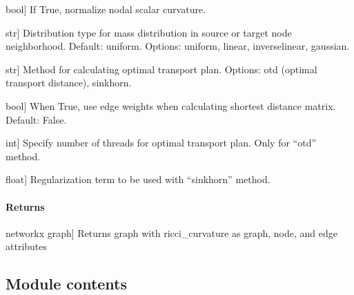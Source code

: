 \documentclass[letterpaper,10pt,english]{sphinxmanual}
\begin{document}
\begin{fulllineitems}
\begin{fulllineitems}
\begin{description}
\sphinxlineitem{norm}{[}bool{]}
\sphinxAtStartPar
If True, normalize nodal scalar curvature.

\sphinxlineitem{dist\_type}{[}str{]}
\sphinxAtStartPar
Distribution type for mass distribution in source or target node neighborhood. Default: uniform. Options: uniform, linear, inverse\sphinxhyphen{}linear, gaussian.

\sphinxlineitem{method}{[}str{]}
\sphinxAtStartPar
Method for calculating optimal transport plan. Options: otd (optimal transport distance), sinkhorn.

\sphinxlineitem{weight\_path\_matrix}{[}bool{]}
\sphinxAtStartPar
When True, use edge weights when calculating shortest distance matrix. Default: False.

\sphinxlineitem{numThreads}{[}int{]}
\sphinxAtStartPar
Specify number of threads for optimal transport plan. Only for “otd” method.

\sphinxlineitem{reg}{[}float{]}
\sphinxAtStartPar
Regularization term to be used with “sinkhorn” method.

\end{description}


\paragraph{Returns}
\label{\detokenize{graph_ricci_curvature:id7}}\begin{description}
\sphinxlineitem{self.G}{[}networkx graph{]}
\sphinxAtStartPar
Returns graph with ricci\_curvature as graph, node, and edge attributes

\end{description}

\end{fulllineitems}


\end{fulllineitems}



\subsection{Module contents}
\label{\detokenize{graph_ricci_curvature:module-graph_ricci_curvature}}\label{\detokenize{graph_ricci_curvature:module-contents}}
\end{document}
